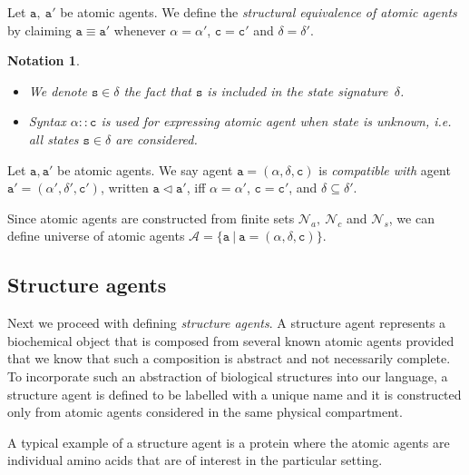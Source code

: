 \documentclass{entcs}
\renewcommand{\~}[0]{\texttildelow}
\newtheorem{notation}[thm]{Notation}
\begin{document}
\begin{definition}
Let $\mathtt{a},~\mathtt{a}'$ be atomic agents. We define the \emph{structural equivalence of atomic agents} by claiming $\mathtt{a}\equiv\mathtt{a}'$ whenever $\mathtt{\alpha} = \mathtt{\alpha}'$, $\mathtt{c} = \mathtt{c}'$ and $\delta = \delta'$.
\end{definition}

\begin{notation}
{~}
\begin{itemize}
\item We denote $\mathtt{s}\in\delta$ the fact that $\mathtt{s}$ is included in the state signature~$\delta$.
\item Syntax $\alpha::\mathtt{c}$ is used for expressing atomic agent when state is unknown, i.e. all states $\mathtt{s} \in \delta$ are considered.
\end{itemize}
\end{notation}

\begin{defn}
Let $\mathtt{a},\mathtt{a}'$ be atomic agents. We say agent $\mathtt{a}=(\alpha, \delta, \mathtt{c})$ is \emph{compatible with} agent $\mathtt{a}'=(\alpha', \delta', \mathtt{c}')$, written $\mathtt{a} \lhd \mathtt{a}'$, iff $\alpha = \alpha'$, $\mathtt{c} = \mathtt{c}'$, and $\delta \subseteq \delta'$. 
\end{defn}

\begin{theorem}
Since atomic agents are constructed from finite sets $\mathcal{N}_{a},~\mathcal{N}_{c}$ and $\mathcal{N}_{s}$, we can define universe of atomic agents $\mathcal{A} = \{ \mathtt{a}~|~\mathtt{a} = (\alpha, \delta, \mathtt{c}) \}$.
\end{theorem}

\subsection{Structure agents}

Next we proceed with defining \emph{structure agents}. A structure agent represents a biochemical object that is composed from several known atomic agents provided that we know that such a composition is abstract and not necessarily complete. To incorporate such an abstraction of biological structures into our language, a structure agent is defined to be labelled with a unique name and it is constructed only from atomic agents considered in the same physical compartment. 

A typical example of a structure agent is a protein where the atomic agents are individual amino acids that are of interest in the particular setting.
\end{document}

